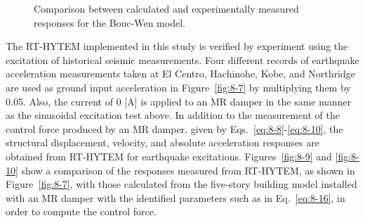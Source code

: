 \begin{figure}[H]
\centering
{}
\caption{Comparison between calculated and experimentally measured responses for the Bouc-Wen model.}
\label{fig:8-8}
\end{figure}

The RT-HYTEM implemented in this study is verified by experiment using the excitation of historical seismic measurements. Four different records of earthquake acceleration measurements taken at El Centro, Hachinohe, Kobe, and Northridge are used as ground input acceleration in Figure~\ref{fig:8-7} by multiplying them by 0.05. Also, the current of 0 [A] is applied to an MR damper in the same manner as the sinusoidal excitation test above. In addition to the measurement of the control force produced by an MR damper, given by Eqs.~\eqref{eq:8-8}-\eqref{eq:8-10}, the structural displacement, velocity, and absolute acceleration responses are obtained from RT-HYTEM for earthquake excitations. Figures~\ref{fig:8-9} and \ref{fig:8-10} show a comparison of the responses measured from RT-HYTEM, as shown in Figure~\ref{fig:8-7}, with those calculated from the five-story building model installed with an MR damper with the identified parameters such as in Eq.~\eqref{eq:8-16}, in order to compute the control force. 

